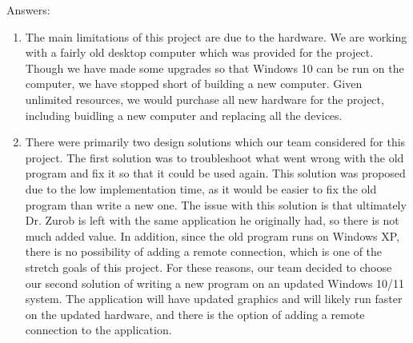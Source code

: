 \documentclass[12pt, titlepage]{article}
\begin{document}
Answers:
\begin{enumerate}
	\item The main limitations of this project are due to the hardware. We are working with a fairly old desktop computer which was provided for the project. Though we have made some upgrades so that Windows 10 can be run on the computer, we have stopped short of building a new computer. Given unlimited resources, we would purchase all new hardware for the project, including buidling a new computer and replacing all the devices. 
	\item There were primarily two design solutions which our team considered for this project. The first solution was to troubleshoot what went wrong with the old program and fix it so that it could be used again. This solution was proposed due to the low implementation time, as it would be easier to fix the old program than write a new one. The issue with this solution is that ultimately Dr. Zurob is left with the same application he originally had, so there is not much added value. In addition, since the old program runs on Windows XP, there is no possibility of adding a remote connection, which is one of the stretch goals of this project. For these reasons, our team decided to choose our second solution of writing a new program on an updated Windows 10/11 system. The application will have updated graphics and will likely run faster on the updated hardware, and there is the option of adding a remote connection to the application. 
\end{enumerate}
\end{document}
